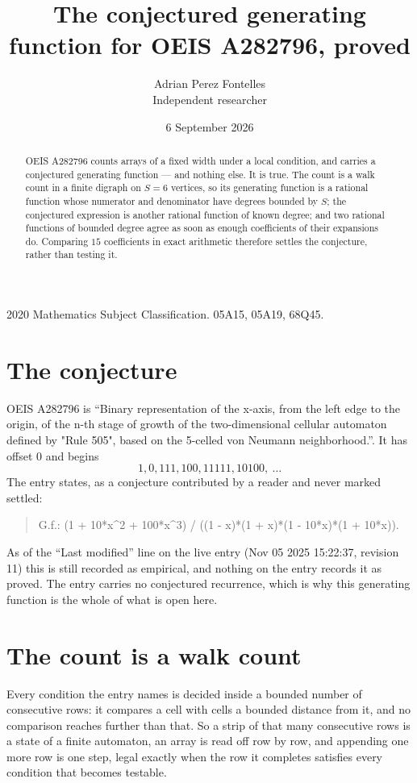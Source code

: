 \documentclass[11pt,a4paper]{article}
\title{The conjectured generating function for OEIS A282796, proved}
\author{Adrian Perez Fontelles\\ \small Independent researcher}
\date{6 September 2026}
\theoremstyle{plain}
\theoremstyle{definition}
\begin{document}
\maketitle

\begin{abstract}
OEIS A282796 counts arrays of a fixed width under a local condition, and carries a conjectured
generating function --- and nothing else. It is true. The count is a walk count in a finite
digraph on $S=6$ vertices, so its generating function is a rational function whose numerator
and denominator have degrees bounded by $S$; the conjectured expression is another rational
function of known degree; and two rational functions of bounded degree agree as soon as enough
coefficients of their expansions do. Comparing $15$ coefficients in exact arithmetic
therefore settles the conjecture, rather than testing it.
\end{abstract}

\noindent\small 2020 Mathematics Subject Classification. 05A15, 05A19, 68Q45.\normalsize

\section{The conjecture}

OEIS A282796 is ``Binary representation of the x-axis, from the left edge to the origin, of the n-th stage of growth of the two-dimensional cellular automaton defined by "Rule 505", based on the 5-celled von Neumann neighborhood.''. It has offset $0$ and begins
\[
1, 0, 111, 100, 11111, 10100,\ \dots
\]
The entry states, as a conjecture contributed by a reader and never marked settled:
\begin{quote}
G.f.: (1 + 10*x\^{}2 + 100*x\^{}3) / ((1 - x)*(1 + x)*(1 - 10*x)*(1 + 10*x)).
\end{quote}
As of the ``Last modified'' line on the live entry (Nov 05 2025 15:22:37, revision 11) this is still
recorded as empirical, and nothing on the entry records it as proved. The entry carries no
conjectured recurrence, which is why this generating function is the whole of what is open
here.

\section{The count is a walk count}

Every condition the entry names is decided inside a bounded number of consecutive rows: it
compares a cell with cells a bounded distance from it, and no comparison reaches further than
that. So a strip of that many consecutive rows is a state of a finite automaton, an array is
read off row by row, and appending one more row is one step, legal exactly when the row it
completes satisfies every condition that becomes testable.
\end{document}
